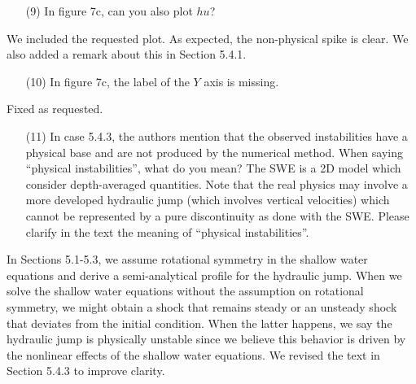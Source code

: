 \documentclass[english,11pt]{article}
\begin{document}
\bigskip
{\color{OliveGreen}
  \begin{itemize}
  \item[(9)]
    In figure 7c, can you also plot $hu$?
  \end{itemize}
}
\noindent
We included the requested plot. As expected, the non-physical spike is clear.
We also added a remark about this in Section 5.4.1.

\bigskip
{\color{OliveGreen}
  \begin{itemize}
  \item[(10)]
    In figure 7c, the label of the $Y$ axis is missing.
  \end{itemize}
}
\noindent
Fixed as requested.

\bigskip
{\color{OliveGreen}
  \begin{itemize}
  \item[(11)]
    In case 5.4.3, the authors mention that the observed instabilities have a physical base and are not 
    produced by the numerical method. When saying ``physical instabilities'', what do you mean? 
    The SWE is a 2D model which consider depth-averaged quantities. Note that the real physics may involve 
    a more developed hydraulic jump (which involves vertical velocities) which cannot be represented by a 
    pure discontinuity as done with the SWE. Please clarify in the text the meaning of ``physical instabilities''.
  \end{itemize}
}
\noindent
In Sections 5.1-5.3, we assume rotational symmetry in the shallow water equations and derive a semi-analytical
profile for the hydraulic jump.
When we solve the shallow water equations without the assumption on rotational symmetry,
we might obtain a shock that remains steady or an unsteady shock that deviates from the initial condition.
When the latter happens, we say the hydraulic jump is physically unstable since we believe this behavior is driven by
the nonlinear effects of the shallow water equations.
We revised the text in Section 5.4.3 to improve clarity. 



\end{document}
